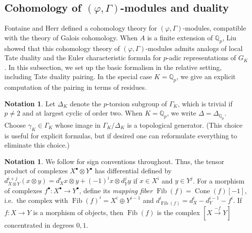 \documentclass[12pt]{article}
\theoremstyle{definition}
\newtheorem{notation}[theorem]{Notation}
\numberwithin{equation}{theorem}
\newcommand{\QQ}{\mathbb{Q}}
\def\Qp{\QQ_p}
\DeclareMathOperator{\Cone}{Cone}
\DeclareMathOperator{\Fib}{Fib}
\begin{document}
\subsection{Cohomology of $(\varphi, \Gamma)$-modules and duality}

Fontaine and Herr \cite{herr} defined a cohomology theory for $(\varphi, \Gamma)$-modules, compatible with the theory of Galois cohomology.  When $A$ is a finite extension of $\Qp$, Liu \cite{liu} showed that this cohomology theory of $(\varphi,\Gamma)$-modules admits analogs of local Tate duality and the Euler characteristic formula for $p$-adic representations of $G_K$.  In this subsection, we set up the basic formalism in the relative setting, including Tate duality pairing.  In the special case $K=\Qp$, we give an explicit computation of the pairing in terms of residues.

\begin{notation}
Let $\Delta_K$ denote the $p$-torsion subgroup of $\Gamma_K$, which is
trivial if $p \neq 2$ and at largest cyclic of order two.  When
$K=\Qp$, we write $\Delta = \Delta_{\Qp}$.  Choose $\gamma_K \in
\Gamma_K$ whose image in $\Gamma_K / \Delta_K$ is a topological
generator. (This choice is useful for explicit formulas, but if
desired one can reformulate everything to eliminate this choice.)
\end{notation}

\begin{notation}
We follow \cite{nekovar} for sign conventions throughout.  Thus, the
tensor product of complexes $X^\bullet \otimes Y^\bullet$ has
differential defined by $d_{X \otimes Y}^{i+j}(x \otimes y) = d_X^ix
\otimes y + (-1)^ix \otimes d_Y^jy$ if $x \in X^i$ and $y \in Y^j$.
For a morphism of complexes $f^\bullet: X^\bullet \to Y^\bullet$,
define its \emph{mapping fiber} $\Fib(f) = \Cone(f)[-1]$, i.e.\ the
complex with $\Fib(f)^i = X^i \oplus Y^{i-1}$ and $d_{\Fib(f)}^i =
d_X^i - d_Y^{i-1} - f^i$.  If $f: X \to Y$ is a morphism of objects,
then $\Fib(f)$ is the complex $[X \xrightarrow{-f} Y]$ concentrated in
degrees $0,1$.
\end{notation}
\end{document}
